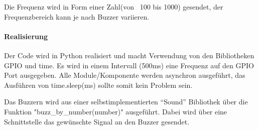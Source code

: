 \documentclass[../../main.tex]{subfiles}
\begin{document}
Die Frequenz wird in Form einer Zahl(von ~100 bis 1000) gesendet, der Frequenzbereich kann je nach Buzzer variieren.

\paragraph{Realisierung}
Der Code wird in Python realisiert und macht Verwendung von den Bibliotheken GPIO und time. Es wird in einem Intervall (500ms) eine Frequenz auf den GPIO Port ausgegeben. Alle Module/Komponente werden asynchron ausgeführt, das Ausführen von time.sleep(ms) sollte somit kein Problem sein.

Das Buzzern wird aus einer selbstimplementierten ``Sound'' Bibliothek über die Funktion "buzz\_by\_number(number)" ausgeführt. Dabei wird über eine Schnittstelle das gewünschte Signal an den Buzzer gesendet.
\end{document}
